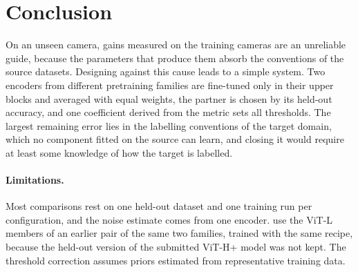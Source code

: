 \documentclass[10pt,twocolumn,letterpaper]{article}
\begin{document}
\begin{table}[t]
\centering\small
\setlength{\tabcolsep}{3pt}
\caption{Submissions to UPAR 2027 Track~1 and the protocol scores of their recipes.}
\label{tab:test}
\end{table}

\section{Conclusion}
\label{sec:conclusion}

On an unseen camera, gains measured on the training cameras are an unreliable guide, because the parameters that produce them absorb the conventions of the source datasets. Designing against this cause leads to a simple system. Two encoders from different pretraining families are fine-tuned only in their upper blocks and averaged with equal weights, the partner is chosen by its held-out accuracy, and one coefficient derived from the metric sets all thresholds. The largest remaining error lies in the labelling conventions of the target domain, which no component fitted on the source can learn, and closing it would require at least some knowledge of how the target is labelled.

\paragraph{Limitations.}\label{sec:limits} Most comparisons rest on one held-out dataset and one training run per configuration, and the noise estimate comes from one encoder.  use the ViT-L members of an earlier pair of the same two families, trained with the same recipe, because the held-out version of the submitted ViT-H+ model was not kept. The threshold correction assumes priors estimated from representative training data.
\end{document}
